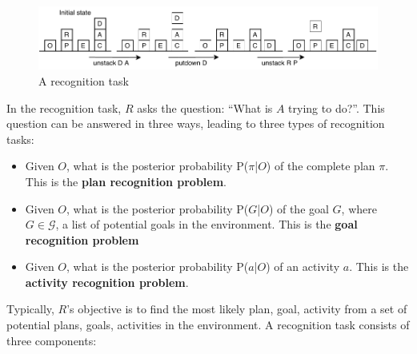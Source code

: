 \begin{figure}[!ht]
  \centering
\includegraphics[width=\columnwidth]{img/bwpr.pdf}
  \caption{A recognition task}
  \label{fig:bwpr}
\end{figure}

\noindent In the recognition task, $R$ asks the question: ``What is $A$ trying to do?''. This question can be answered in three ways, leading to three types of recognition tasks:
\begin{itemize}
\item Given $O$, what is the posterior probability P($\pi$|$O$) of the complete plan $\pi$. This is the \textbf{plan recognition problem}.
\item Given $O$, what is the posterior probability P($G$|$O$) of the goal $G$, where $G \in \mathcal{G}$, a list of potential goals in the environment. This is the \textbf{goal recognition problem}
\item Given $O$, what is the posterior probability P($a$|$O$) of an activity $a$. This is the \textbf{activity recognition problem}.
\end{itemize}
\noindent Typically, $R$'s objective is to find the most likely plan, goal, activity from a set of potential plans, goals, activities in the environment. A recognition task consists of three components:
